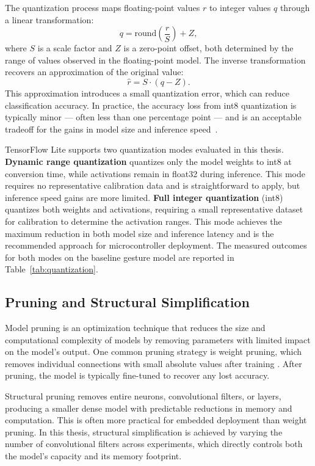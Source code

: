 The quantization process maps floating-point values $r$ to integer values $q$ through a linear transformation:
\begin{equation}
  q = \text{round}\!\left(\frac{r}{S}\right) + Z,
\end{equation}
where $S$ is a scale factor and $Z$ is a zero-point offset, both determined by the range of values observed in the floating-point model. The inverse transformation recovers an approximation of the original value:
\begin{equation}
  \hat{r} = S \cdot (q - Z).
\end{equation}
This approximation introduces a small quantization error, which can reduce classification accuracy. In practice, the accuracy loss from int8 quantization is typically minor — often less than one percentage point — and is an acceptable tradeoff for the gains in model size and inference speed~\cite{warden2018speech}.

TensorFlow Lite supports two quantization modes evaluated in this thesis. \textbf{Dynamic range quantization} quantizes only the model weights to int8 at conversion time, while activations remain in float32 during inference. This mode requires no representative calibration data and is straightforward to apply, but inference speed gains are more limited. \textbf{Full integer quantization} (int8) quantizes both weights and activations, requiring a small representative dataset for calibration to determine the activation ranges. This mode achieves the maximum reduction in both model size and inference latency and is the recommended approach for microcontroller deployment. The measured outcomes for both modes on the baseline gesture
model are reported in Table~\ref{tab:quantization}.

\subsection{Pruning and Structural Simplification}
Model pruning is an optimization technique that reduces the size and computational complexity of models by removing parameters with limited impact on the model's output. One common pruning strategy is weight pruning, which removes individual connections with small absolute values after training \cite{han2015pruning}. After pruning, the model is typically fine-tuned to recover any lost accuracy.

Structural pruning removes entire neurons, convolutional filters, or layers, producing a smaller dense model with predictable reductions in memory and computation. This is often more practical for embedded deployment than weight pruning. In this thesis, structural simplification is achieved by varying the number of convolutional filters across experiments, which directly controls both the model's capacity and its memory footprint. 

